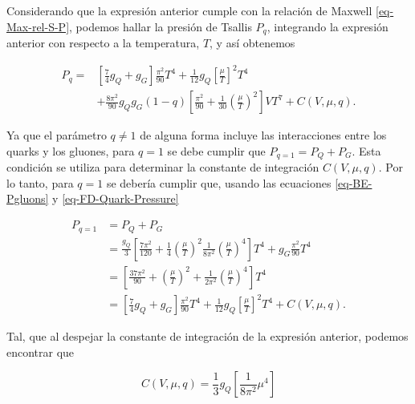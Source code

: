 Considerando que la expresión anterior cumple con la relación de Maxwell \eqref{eq-Max-rel-S-P}, podemos hallar la presión de Tsallis ${P}_{q}$, integrando la expresión anterior con respecto a la temperatura, $T$, y así obtenemos

\begin{equation}\label{eq-Tsallis-Pressure}
\begin{split}
{P}_{q} = & \left[\frac{7}{4} {g}_{Q} + {g}_{G} \right] \frac{{\pi}^{2}}{90} {T}^{4} + \frac{1}{12}{g}_{Q} \left[\frac{\mu}{T}\right]^{2}{T}^{4}\\
& + \frac{8{\pi}^{2}}{90} {g}_{Q}{g}_{G}(1-q) \left[\frac{{\pi}^{2}}{90} + \frac{1}{30} \left( \frac{\mu}{T}\right)^{2}\right]V{T}^{7} + C(V,\mu,q).
\end{split}
\end{equation}

Ya que el parámetro $q \neq 1$ de alguna forma incluye las interacciones entre los quarks y los gluones, para $q=1$ se debe cumplir que ${P}_{q=1} = {P}_{Q} + {P}_{G}$. Esta condición se utiliza para determinar la constante de integración $C(V,\mu,q)$. Por lo tanto, para $q = 1$ se debería cumplir que, usando las ecuaciones \eqref{eq-BE-Pgluons} y \eqref{eq-FD-Quark-Pressure}

\begin{equation}\label{eq-Tsallis-Pressure-Const}
\begin{split}
{P}_{q=1} & = {P}_{Q} + {P}_{G}\\
& = \frac{{g}_{Q}}{3} \left[\frac{7 {\pi}^{2}}{120} + \frac{1}{4} \left(\frac{\mu}{T} \right)^{2} \frac{1}{8{\pi}^{2}} \left(\frac{\mu}{T} \right)^{4} \right] {T}^{4} + {g}_{G} \frac{{\pi}^{2}}{90}{T}^{4} \\
& = \left[\frac{37{\pi}^{2}}{90} + \left(\frac{\mu}{T} \right)^{2} + \frac{1}{2{\pi}^{2}}\left( \frac{\mu}{T}\right)^{4} \right]{T}^{4} \\
& = \left[\frac{7}{4} {g}_{Q} + {g}_{G} \right] \frac{{\pi}^{2}}{90} {T}^{4} + \frac{1}{12}{g}_{Q} \left[\frac{\mu}{T}\right]^{2}{T}^{4} + C(V,\mu,q).
\end{split}
\end{equation}

Tal, que al despejar la constante de integración de la expresión anterior, podemos encontrar que

\begin{equation}
C(V,\mu,q) = \frac{1}{3}{g}_{Q} \left[\frac{1}{8{\pi}^{2}} {\mu}^{4} \right]
\end{equation}

